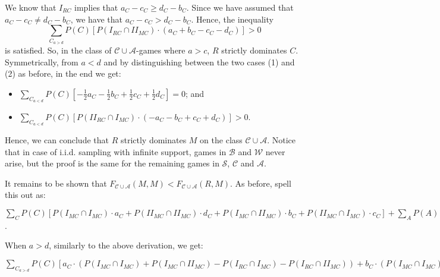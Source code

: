 \documentclass[fleqn,reqno,11pt]{article}
\begin{document}
\noindent We know that $I_{RC}$ implies that $a_{C}-c_{C}\geq d_{C}-b_{C}$.
Since we have assumed that $a_{C}-c_{C}\neq d_{C}-b_{C}$, we have that
$a_{C}-c_{C} > d_{C}-b_{C}$. Hence, the inequality
$$\sum_{C_{a>d}} P(C)[P(I_{RC}\cap II_{MC})\cdot (a_{C} + b_{C} - c_{C} - d_{C})]> 0$$
is satisfied. So, in the class of $\mathcal{C} \cup \mathcal{A}$-games where $a >c$, $R$
strictly dominates $C$. Symmetrically, from $a<d$ and by distinguishing between the two cases
(1) and (2) as before, in the end we get:
\begin{itemize}
\item $\sum_{C_{a<d}} P(C)[-\frac{1}{2}a_{C}- \frac{1}{2}b_{C} + \frac{1}{2}c_{C} + \frac{1}{2}d_{C}]= 0$; and
\item $\sum_{C_{a<d}} P(C)[P(II_{RC}\cap I_{MC})\cdot (-a_{C} - b_{C} + c_{C} + d_{C})]> 0$.
\end{itemize}
\noindent Hence, we can conclude that $R$ strictly dominates $M$ on the class
$\mathcal{C}\cup\mathcal{A}$. Notice that in case of i.i.d. sampling with infinite support,
games in $\mathcal{B} $ and $\mathcal{W} $ never arise, but the proof is the same for the
remaining games in $\mathcal{S}$, $\mathcal{C} $ and $\mathcal{A}$.

\medskip{}

It remains to be shown that
$F_{\mathcal{C}\cup\mathcal{A}}(M,M)<F_{\mathcal{C}\cup\mathcal{A}}(R,M)$. As before, spell
this out as:

\noindent $\sum_{C}P(C)[P(I_{MC}\cap I_{MC})\cdot a_{C}+P(II_{MC}\cap II_{MC})\cdot d_{C}+P(I_{MC}\cap II_{MC})\cdot b_{C}+P(II_{MC}\cap I_{MC})\cdot c_{C}]+\sum_{A}P(A)[P(I_{MA}\cap I_{MA})\cdot a_{A}+P(II_{MA}\cap II_{MA})\cdot d_{A}+P(I_{MA}\cap II_{MA})\cdot b_{A}+P(II_{MA}\cap I_{MA})\cdot c_{A}] < \sum_{C}P(C)[P(I_{RC}\cap I_{MC})\cdot a_{C}+P(II_{RC}\cap II_{MC})\cdot d_{C}+P(I_{RC}\cap II_{MC})\cdot b_{C}+P(II_{RC}\cap I_{MC})\cdot c_{C}]+\sum_{A}P(A)[P(I_{RA}\cap I_{MA})\cdot a_{A}+P(II_{RA}\cap II_{MA})\cdot d_{A}+P(I_{RA}\cap II_{MA})\cdot b_{A}+P(II_{RA}\cap I_{MA})\cdot c_{A}]$.
\medskip{}

\noindent When $a>d$, similarly to the above derivation, we get: 

\medskip{}
\noindent $\sum_{C_{a>d}} P(C)[a_{C} \cdot (P(I_{MC}\cap I_{MC}) + P(I_{MC}\cap II_{MC})- P(I_{RC}\cap I_{MC}) - P(I_{RC}\cap II_{MC})) + b_{C} \cdot  (P(I_{MC}\cap I_{MC}) + P(I_{MC}\cap II_{MC})- P(I_{RC}\cap I_{MC}) - P(I_{RC}\cap II_{MC})) + c_{C} \cdot (P(II_{MC}\cap I_{MC}) +P(II_{MC}\cap II_{MC})- P(II_{RC}\cap II_{MC})) + d_{C} \cdot (P(II_{MC}\cap II_{MC})+P(II_{MC}\cap I_{MC})- P(II_{RC}\cap II_{MC}))]< 0$
\medskip{}
\end{document}
